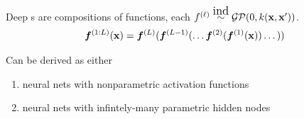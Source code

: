 \documentclass[portrait,a0b,final,a4resizeable]{include/a0poster}
\begin{document}
\begin{poster}
\begin{multicols}{2}


%

\vspace{0.5in} 


Deep \gp{}s are compositions of functions, each $f^{(\ell)} \simind \GPt{0}{k(\vx, \vx')}$. 
\begin{align*}
\boldsymbol{f}^{(1:L)}(\mathbf{x}) = \boldsymbol{f}^{(L)}(\boldsymbol{f}^{(L-1)}(\dots \boldsymbol{f}^{(2)}(\boldsymbol{f}^{(1)}(\mathbf{x})) \dots))
\end{align*}
%

Can be derived as either
\begin{enumerate}
	\item  neural nets with nonparametric activation functions
    \item  neural nets with infintely-many parametric hidden nodes
\end{enumerate}



\newlength{\arrowsize}  





\end{multicols}
\end{poster}
\end{document}
